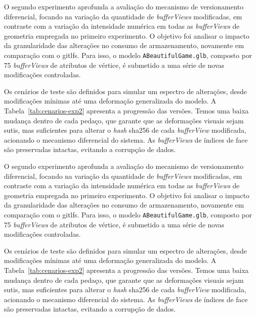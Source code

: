 O segundo experimento aprofunda a avaliação do mecanismo de versionamento
diferencial, focando na variação da quantidade de \textit{bufferViews} modificadas,
em contraste com a variação da intensidade numérica em todas as
\textit{bufferViews} de geometria empregada no primeiro experimento. O objetivo foi
analisar o impacto da granularidade das alterações no consumo de armazenamento,
novamente em comparação com o \gls{gitlfs}. Para isso, o modelo
\texttt{ABeautifulGame.glb}, composto por 75 \textit{bufferViews} de atributos de
vértice, é submetido a uma série de novas modificações controladas.

Os cenários de teste são definidos para simular um espectro de alterações, desde
modificações mínimas até uma deformação generalizada do modelo. A
Tabela~\ref{tab:cenarios-exp2} apresenta a progressão das versões. Temos uma baixa
mudança dentro de cada pedaço, que garante que as deformações visuais sejam sutis,
mas suficientes para alterar o \textit{hash} \gls{sha256} de cada
\textit{bufferView} modificada, acionando o mecanismo diferencial do sistema. As
\textit{bufferViews} de índices de face são preservadas intactas, evitando a
corrupção de dados.

O segundo experimento aprofunda a avaliação do mecanismo de versionamento
diferencial, focando na variação da quantidade de \textit{bufferViews} modificadas,
em contraste com a variação da intensidade numérica em todas as
\textit{bufferViews} de geometria empregada no primeiro experimento. O objetivo foi
analisar o impacto da granularidade das alterações no consumo de armazenamento,
novamente em comparação com o \gls{gitlfs}. Para isso, o modelo
\texttt{ABeautifulGame.glb}, composto por 75 \textit{bufferViews} de atributos de
vértice, é submetido a uma série de novas modificações controladas.

Os cenários de teste são definidos para simular um espectro de alterações, desde
modificações mínimas até uma deformação generalizada do modelo. A
Tabela~\ref{tab:cenarios-exp2} apresenta a progressão das versões. Temos uma baixa
mudança dentro de cada pedaço, que garante que as deformações visuais sejam sutis,
mas suficientes para alterar o \textit{hash} \gls{sha256} de cada
\textit{bufferView} modificada, acionando o mecanismo diferencial do sistema. As
\textit{bufferViews} de índices de face são preservadas intactas, evitando a
corrupção de dados.

